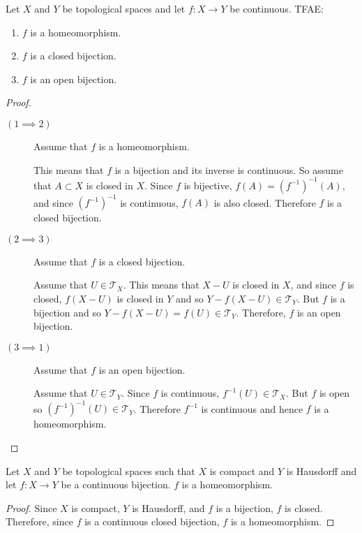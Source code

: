\documentclass[letterpaper,12pt,fleqn]{article}
\newcommand{\T}{\mathscr{T}}
\begin{document}
\begin{theorem}[7.28]
  Let \(X\) and \(Y\) be topological spaces and let \(f:X\to Y\) be continuous.  TFAE:
  \begin{enumerate}
  \item \(f\) is a homeomorphism.
  \item \(f\) is a closed bijection.
  \item \(f\) is an open bijection.
  \end{enumerate}
\end{theorem}

\begin{proof}
  \begin{description}
  \item[]
  \item[\((1\implies 2)\)] Assume that \(f\) is a homeomorphism.

    This means that \(f\) is a bijection and its inverse is continuous.  So assume that \(A\subset X\) is closed in
    \(X\). Since \(f\) is bijective, \(f(A)=(f^{-1})^{-1}(A)\), and since \((f^{-1})^{-1}\) is continuous, \(f(A)\)
    is also closed.  Therefore \(f\) is a closed bijection.

  \item[\((2\implies 3)\)] Assume that \(f\) is a closed bijection.

    Assume that \(U\in\T_X\).  This means that \(X-U\) is closed in \(X\), and since \(f\) is closed, \(f(X-U)\)
    is closed in \(Y\) and so \(Y-f(X-U)\in\T_Y\).  But \(f\) is a bijection and so \(Y-f(X-U)=f(U)\in\T_Y\).
    Therefore, \(f\) is an open bijection.

  \item[\((3\implies 1)\)] Assume that \(f\) is an open bijection.

    Assume that \(U\in\T_Y\).  Since \(f\) is continuous, \(f^{-1}(U)\in\T_X\).  But \(f\) is open so
    \((f^{-1})^{-1}(U)\in\T_Y\).  Therefore \(f^{-1}\) is continuous and hence \(f\) is a homeomorphism.
  \end{description}
\end{proof}

\begin{theorem}[7.29]
  Let \(X\) and \(Y\) be topological spaces such that \(X\) is compact and \(Y\) is Hausdorff and let \(f:X\to Y\)
  be a continuous bijection.  \(f\) is a homeomorphism.
\end{theorem}

\begin{proof}
  Since \(X\) is compact, \(Y\) is Hausdorff, and \(f\) is a bijection, \(f\) is closed.  Therefore, since \(f\) is
  a continuous closed bijection, \(f\) is a homeomorphism.
\end{proof}
\end{document}
